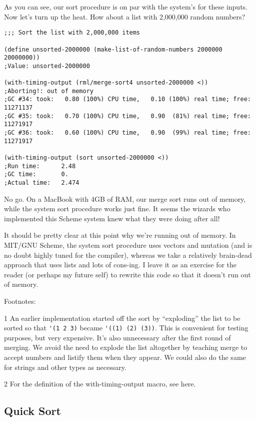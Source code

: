 \documentclass[12pt,openright,draft]{book}
\begin{document}
As you can see, our sort procedure is on par with the system's for
these inputs. Now let's turn up the heat. How about a list with
2,000,000 random numbers?

\begin{verbatim}
;;; Sort the list with 2,000,000 items

(define unsorted-2000000 (make-list-of-random-numbers 2000000 20000000))
;Value: unsorted-2000000

(with-timing-output (rml/merge-sort4 unsorted-2000000 <))
;Aborting!: out of memory
;GC #34: took:   0.80 (100%) CPU time,   0.10 (100%) real time; free: 11271137
;GC #35: took:   0.70 (100%) CPU time,   0.90  (81%) real time; free: 11271917
;GC #36: took:   0.60 (100%) CPU time,   0.90  (99%) real time; free: 11271917

(with-timing-output (sort unsorted-2000000 <))
;Run time:      2.48
;GC time:       0.
;Actual time:   2.474

\end{verbatim}

No go. On a MacBook with 4GB of RAM, our merge sort runs out of
memory, while the system sort procedure works just fine. It seems the
wizards who implemented this Scheme system knew what they were doing
after all!

It should be pretty clear at this point why we're running out of
memory. In MIT/GNU Scheme, the system sort procedure uses vectors and
mutation (and is no doubt highly tuned for the compiler), whereas we
take a relatively brain-dead approach that uses lists and lots of
cons-ing. I leave it as an exercise for the reader (or perhaps my
future self) to rewrite this code so that it doesn't run out of
memory.

Footnotes:

1 An earlier implementation started off the sort by
``exploding'' the list to be sorted so that
\verb|'(1 2 3)| became \verb|'((1) (2) (3))|. This is convenient for
testing purposes, but very expensive. It's also unnecessary after the
first round of merging. We avoid the need to explode the list
altogether by teaching merge to accept numbers and listify them when
they appear. We could also do the same for strings and other types as
necessary.

2 For the definition of the with-timing-output macro, see here.

\subsection{Quick Sort}
\end{document}
